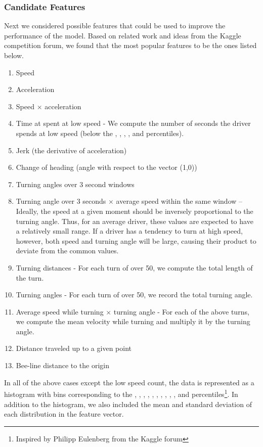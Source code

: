 \documentclass{article}
\begin{document}
\subsubsection{Candidate Features}

Next we considered possible features that could be used to improve the performance of the model. Based on related work and ideas from the Kaggle competition forum, we found that the most popular features to be the ones listed below.

\begin{enumerate}
\item Speed
\item Acceleration
\item Speed $\times$ acceleration %
\item Time at spent at low speed - We compute the number of seconds the driver spends at low speed (below the , , , ,  and  percentiles).
\item Jerk (the derivative of acceleration)
\item Change of heading (angle with respect to the vector (1,0))
\item Turning angles over 3 second windows 
\item Turning angle over 3 seconds $\times$ average speed within the same window -- Ideally, the speed at a given moment should be inversely proportional to the turning angle. Thus, for an average driver, these values are expected to have a relatively small range. If a driver has a tendency to turn at high speed, however, both speed and turning angle will be large, causing their product to deviate from the common values.
\item Turning distances - For each turn of over 50\degree, we compute the total length of the turn.
\item Turning angles - For each turn of over 50\degree, we record the total turning angle.
\item Average speed while turning $\times$ turning angle - For each of the above turns, we compute the mean velocity while turning and multiply it by the turning angle. 
\item Distance traveled up to a given point
\item Bee-line distance to the origin
\end{enumerate}


In all of the above cases except the low speed count, the data is represented as a histogram with bins corresponding to the , , , , , , , , , ,  and  percentiles\footnote{Inspired by Philipp Eulenberg from the Kaggle forum}. In addition to the histogram, we also included the mean and standard deviation of each distribution in the feature vector.
\end{document}
